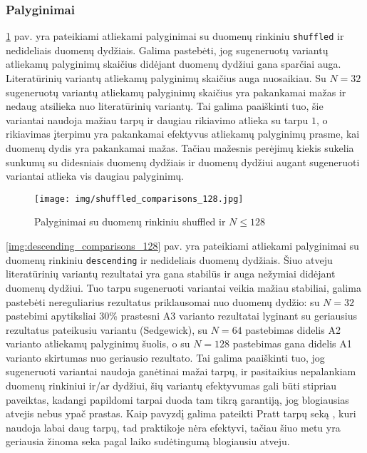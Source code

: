 \documentclass{VUMIFInfBakalaurinis}
\begin{document}
\pagebreak

\subsubsection{Palyginimai}

\ref{img:shuffled_comparisons_128} pav. yra pateikiami atliekami palyginimai su duomenų rinkiniu \verb|shuffled| ir nedideliais duomenų dydžiais.
Galima pastebėti, jog sugeneruotų variantų atliekamų palyginimų skaičius didėjant duomenų dydžiui gana sparčiai auga.
Literatūrinių variantų atliekamų palyginimų skaičius auga nuosaikiau.
Su $N = 32$ sugeneruotų variantų atliekamų palyginimų skaičius yra pakankamai mažas ir nedaug atsilieka nuo literatūrinių variantų.
Tai galima paaiškinti tuo, šie variantai naudoja mažiau tarpų ir daugiau rikiavimo atlieka su tarpu $1$,
o rikiavimas įterpimu yra pakankamai efektyvus atliekamų palyginimų prasme, kai duomenų dydis yra pakankamai mažas.
Tačiau mažesnis perėjimų kiekis sukelia sunkumų su didesniais duomenų dydžiais ir duomenų dydžiui augant sugeneruoti variantai atlieka vis daugiau palyginimų.

\begin{figure}[H]
  \centering
  \texttt{[image: img/shuffled\_comparisons\_128.jpg]}
  \caption{Palyginimai su duomenų rinkiniu shuffled ir $N \leq 128$}
  \label{img:shuffled_comparisons_128}
\end{figure}


\ref{img:descending_comparisons_128} pav. yra pateikiami atliekami palyginimai su duomenų rinkiniu \verb|descending| ir nedideliais duomenų dydžiais.
Šiuo atveju literatūrinių variantų rezultatai yra gana stabilūs ir auga nežymiai didėjant duomenų dydžiui.
Tuo tarpu sugeneruoti variantai veikia mažiau stabiliai, galima pastebėti nereguliarius rezultatus priklausomai nuo duomenų dydžio:
su $N = 32$ pastebimi apytiksliai 30\% prastesni A3 varianto rezultatai lyginant su geriausius rezultatus pateikusiu variantu (Sedgewick),
su $N = 64$ pastebimas didelis A2 varianto atliekamų palyginimų šuolis,
o su $N = 128$ pastebimas gana didelis A1 varianto skirtumas nuo geriausio rezultato.
Tai galima paaiškinti tuo, jog sugeneruoti variantai naudoja ganėtinai mažai tarpų, ir pasitaikius nepalankiam duomenų rinkiniui ir/ar dydžiui,
šių variantų efektyvumas gali būti stipriau paveiktas, kadangi papildomi tarpai duoda tam tikrą garantiją, jog blogiausias atvejis nebus ypač prastas.
Kaip pavyzdį galima pateikti Pratt tarpų seką \cite{pratt1972shellsort}, kuri naudoja labai daug tarpų, tad praktikoje nėra efektyvi, tačiau
šiuo metu yra geriausia žinoma seka pagal laiko sudėtingumą blogiausiu atveju.
\end{document}
